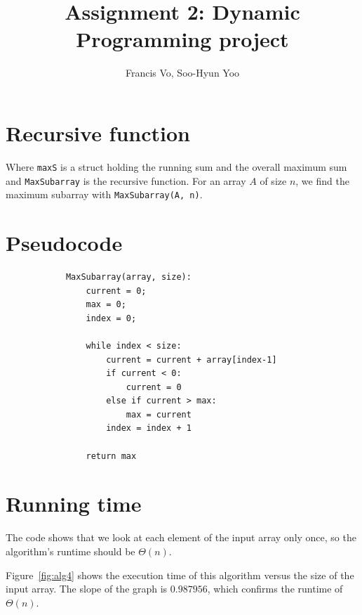 \documentclass[a4paper,10pt]{article}
\title{Assignment 2: Dynamic Programming project}
\author{Francis Vo, Soo-Hyun Yoo}
\begin{document}
	\maketitle

	\section{Recursive function}
		

		\noindent Where {\tt maxS} is a struct holding the running sum and the overall maximum sum and {\tt MaxSubarray} is the recursive function. For an array $A$ of size $n$, we find the maximum subarray with {\tt MaxSubarray(A, n)}.


	\section{Pseudocode}
		\begin{verbatim}
		    MaxSubarray(array, size):
		        current = 0;
		        max = 0;
		        index = 0;

		        while index < size:
		            current = current + array[index-1]
		            if current < 0:
		                current = 0
		            else if current > max:
		                max = current
		            index = index + 1

		        return max
		\end{verbatim}


	\section{Running time}

		The code shows that we look at each element of the input array only once, so the algorithm's runtime should be $\Theta(n)$.

		Figure~\ref{fig:alg4} shows the execution time of this algorithm versus the size of the input array. The slope of the graph is $0.987956$, which confirms the runtime of $\Theta(n)$.
\end{document}
